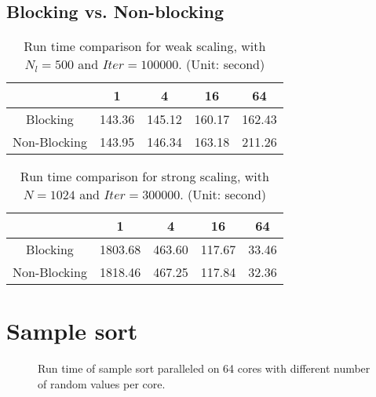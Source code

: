 \documentclass[11pt, oneside]{article}   	%
\begin{document}
\subsection{Blocking vs. Non-blocking}
\begin{table}[h]
\centering
\caption{Run time comparison for weak scaling, with $N_l=500$ and $Iter= 100000$. (Unit: second)}
\begin{tabular}{|c|c|c|c|c|}
\hline
             & 1 & 4 & 16 & 64 \\ \hline
Blocking  &  143.36 &  145.12 & 160.17 &162.43    \\ \hline
Non-Blocking &  143.95&146.34&163.18&211.26   \\ \hline
\end{tabular}
\end{table}
\begin{table}[h]
\centering
\caption{Run time comparison for strong scaling, with $N=1024$ and $Iter= 300000$. (Unit: second)}
\begin{tabular}{|c|c|c|c|c|}
\hline
             & 1 & 4 & 16 & 64 \\ \hline
Blocking     &   1803.68 & 463.60 & 117.67 & 33.46    \\ \hline
Non-Blocking &   1818.46 & 467.25 &117.84 & 32.36    \\ \hline
\end{tabular}
\end{table}
\section{Sample sort}
\begin{figure}[ht]
\centering
{}
\caption{Run time of sample sort paralleled on 64 cores with different number of random values per core.}
\end{figure}
\end{document}
